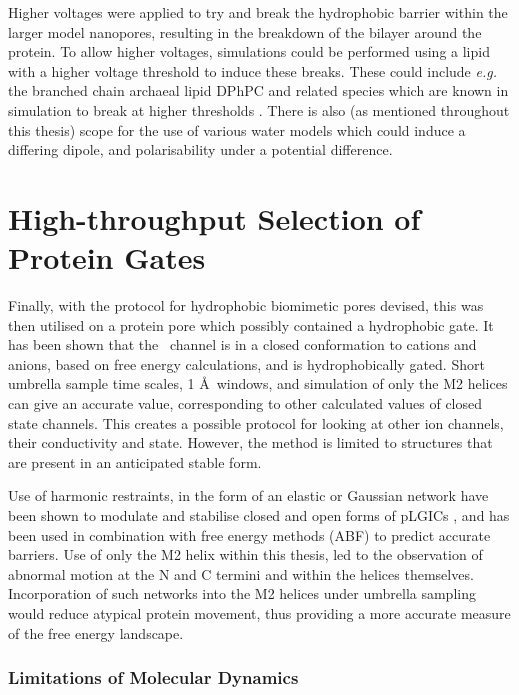 Higher voltages were applied to try and break the hydrophobic barrier within the larger model nanopores, resulting in the breakdown of the bilayer around the protein. To allow higher voltages, simulations could be performed using a lipid with a higher voltage threshold to induce these breaks. These could include \textit{e.g.} the branched chain archaeal lipid DPhPC and related species which are known in simulation to break at higher thresholds \cite{Polak2013}. There is also (as mentioned throughout this thesis) scope for the use of various water models which could induce a differing dipole, and polarisability under a potential difference.

\section{High-throughput Selection of Protein Gates}

Finally, with the protocol for hydrophobic biomimetic pores devised, this was then utilised on a protein pore which possibly contained a hydrophobic gate. It has been shown that the \HT\ channel is in a closed conformation to cations and anions, based on free energy calculations, and is hydrophobically gated. Short umbrella sample time scales, 1 \AA\ windows, and simulation of only the M2 helices can give an accurate value, corresponding to other calculated values of closed state channels.  This creates a possible protocol for looking at other ion channels, their conductivity and state. However, the method is limited to structures that are present in an anticipated stable form. 

Use of harmonic restraints, in the form of an elastic or Gaussian network have been shown to modulate and stabilise closed and open forms of pLGICs \cite{Nury2010,Zhu2010}, and has been used in combination with free energy methods (ABF) \cite{Cheng2012} to predict accurate barriers. Use of only the M2 helix within this thesis, led to the observation of abnormal motion at the N and C termini and within the helices themselves. Incorporation of such networks into the M2 helices under umbrella sampling would reduce atypical protein movement, thus providing a more accurate measure of the free energy landscape. 


\subsubsection*{Limitations of Molecular Dynamics}

